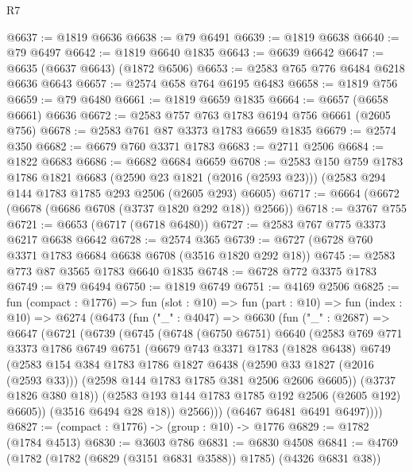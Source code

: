 \begin{lexlean}{R7}
\begin{coremodule}
@6637 := @1819 @6636
@6638 := @79 @6491
@6639 := @1819 @6638
@6640 := @79 @6497
@6642 := @1819 @6640 @1835
@6643 := @6639 @6642
@6647 := @6635 (@6637 @6643) (@1872 @6506)
@6653 := @2583 @765 @776 @6484 @6218 @6636 @6643
@6657 := @2574 @658 @764 @6195 @6483
@6658 := @1819 @756
@6659 := @79 @6480
@6661 := @1819 @6659 @1835
@6664 := @6657 (@6658 @6661) @6636
@6672 := @2583 @757 @763 @1783 @6194 @756 @6661 (@2605 @756)
@6678 := @2583 @761 @87 @3373 @1783 @6659 @1835
@6679 := @2574 @350
@6682 := @6679 @760 @3371 @1783
@6683 := @2711 @2506
@6684 := @1822 @6683
@6686 := @6682 @6684 @6659
@6708 := @2583
    @150
    @759
    @1783
    @1786
    @1821
    @6683
    (@2590 @23 @1821 (@2016 (@2593 @23)))
    (@2583 @294 @144 @1783 @1785 @293 @2506 (@2605 @293) @6605)
@6717 := @6664 (@6672 (@6678 (@6686 @6708 (@3737 @1820 @292 @18)) @2566))
@6718 := @3767 @755
@6721 := @6653 (@6717 (@6718 @6480))
@6727 := @2583 @767 @775 @3373 @6217 @6638 @6642
@6728 := @2574 @365
@6739 := @6727 (@6728 @760 @3371 @1783 @6684 @6638 @6708 (@3516 @1820 @292 @18))
@6745 := @2583 @773 @87 @3565 @1783 @6640 @1835
@6748 := @6728 @772 @3375 @1783
@6749 := @79 @6494
@6750 := @1819 @6749
@6751 := @4169 @2506
@6825 := fun (compact : @1776) =>
  fun (slot : @10) =>
  fun (part : @10) =>
  fun (index : @10) =>
  @6274
    (@6473
      (fun ("_" : @4047) =>
      @6630
        (fun ("_" : @2687) =>
        @6647
          (@6721
            (@6739
              (@6745
                (@6748
                  (@6750 @6751)
                  @6640
                  (@2583
                    @769
                    @771
                    @3373
                    @1786
                    @6749
                    @6751
                    (@6679
                      @743
                      @3371
                      @1783
                      (@1828 @6438)
                      @6749
                      (@2583
                        @154
                        @384
                        @1783
                        @1786
                        @1827
                        @6438
                        (@2590 @33 @1827 (@2016 (@2593 @33)))
                        (@2598 @144 @1783 @1785 @381 @2506 @2606 @6605))
                      (@3737 @1826 @380 @18))
                    (@2583 @193 @144 @1783 @1785 @192 @2506 (@2605 @192) @6605))
                  (@3516 @6494 @28 @18))
                @2566)))
          (@6467 @6481 @6491 @6497))))
@6827 := (compact : @1776) -> (group : @10) -> @1776
@6829 := @1782 (@1784 @4513)
@6830 := @3603 @786
@6831 := @6830 @4508
@6841 := @4769 (@1782 (@1782 (@6829 (@3151 @6831 @3588)) @1785) (@4326 @6831 @38))

\end{coremodule}
\end{lexlean}
